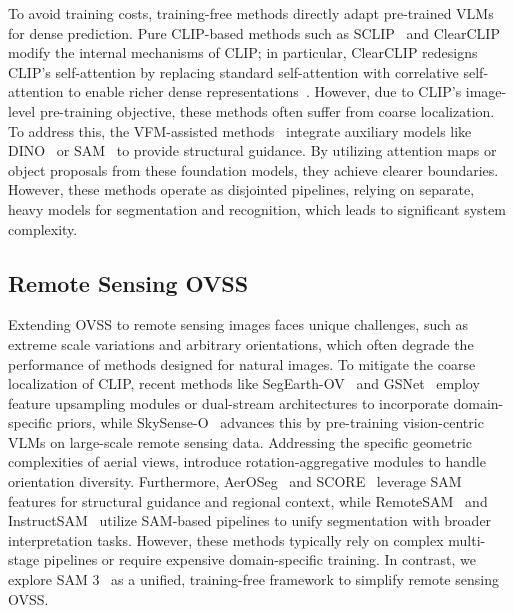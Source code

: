 \documentclass[twocolumn,switch,times]{article}
\begin{document}
To avoid training costs, training-free methods directly adapt pre-trained VLMs for dense prediction. Pure CLIP-based methods such as SCLIP~\citep{wang2023sclip} and ClearCLIP~\citep{lan2024clearclip} modify the internal mechanisms of CLIP; in particular, ClearCLIP redesigns CLIP's self-attention by replacing standard self-attention with correlative self-attention to enable richer dense representations~\citep{zhou2022extract, bousselham2024grounding, hajimiri2025pay, jin2025feature}. However, due to CLIP's image-level pre-training objective, these methods often suffer from coarse localization. To address this, the VFM-assisted methods~\citep{lan2025proxyclip, zhang2025corrclip, shi2025harnessing, kim2025distilling, barsellotti2024training} integrate auxiliary models like DINO~\citep{caron2021emerging, oquab2023dinov2} or SAM~\citep{kirillov2023segment, ravi2024sam} to provide structural guidance. By utilizing attention maps or object proposals from these foundation models, they achieve clearer boundaries. However, these methods operate as disjointed pipelines, relying on separate, heavy models for segmentation and recognition, which leads to significant system complexity.

\subsection{Remote Sensing OVSS}

Extending OVSS to remote sensing images faces unique challenges, such as extreme scale variations and arbitrary orientations, which often degrade the performance of methods designed for natural images. To mitigate the coarse localization of CLIP, recent methods like SegEarth-OV~\citep{li2025segearth} and GSNet~\citep{ye2025towards} employ feature upsampling modules or dual-stream architectures to incorporate domain-specific priors, while SkySense-O~\citep{zhu2025skysense} advances this by pre-training vision-centric VLMs on large-scale remote sensing data. Addressing the specific geometric complexities of aerial views, \cite{cao2024open} introduce rotation-aggregative modules to handle orientation diversity. Furthermore, AerOSeg~\citep{dutta2025aeroseg} and SCORE~\citep{huang2025score} leverage SAM features for structural guidance and regional context, while RemoteSAM~\citep{yao2025remotesam} and InstructSAM~\citep{zheng2025instructsam} utilize SAM-based pipelines to unify segmentation with broader interpretation tasks. However, these methods typically rely on complex multi-stage pipelines or require expensive domain-specific training. In contrast, we explore SAM 3~\citep{carion2025sam} as a unified, training-free framework to simplify remote sensing OVSS.
\end{document}

